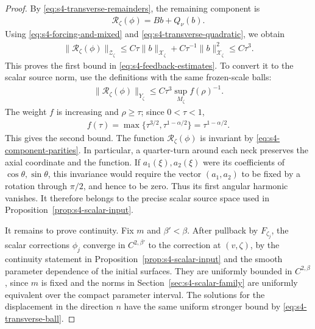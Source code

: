 \documentclass[a4paper,11pt,oneside,reqno]{amsart}
\numberwithin{equation}{section}
\theoremstyle{definition}
\begin{document}
\begin{proof}
    By \eqref{eq:s4-transverse-remainders}, the remaining
    component is
    \begin{align*}
        \mathcal{R}_\zeta(\phi)=Bb+Q_\nu(b).
    \end{align*}
    Using \eqref{eq:s4-forcing-and-mixed} and
    \eqref{eq:s4-transverse-quadratic}, we obtain
    \begin{align*}
        \|\mathcal{R}_\zeta(\phi)\|_{\mathcal{Z}_\zeta}
        \leq C\tau\|b\|_{\mathcal{X}_\zeta}
        +C\tau^{-1}\|b\|_{\mathcal{X}_\zeta}^2
        \leq C\tau^3.
    \end{align*}
    This proves the first bound in
    \eqref{eq:s4-feedback-estimates}. To convert it to the
    scalar source norm, use the definitions with the same
    frozen-scale balls:
    \begin{align*}
        \|\mathcal{R}_\zeta(\phi)\|_{Y_\zeta}
        \leq C\tau^3\sup_{M_\zeta}f(\rho)^{-1}.
    \end{align*}
    The weight $f$ is increasing and $\rho\geq\tau$; since
    $0<\tau<1$,
    \begin{align*}
        f(\tau)=\max\{\tau^{3/2},\tau^{1-\alpha/2}\}
        =\tau^{1-\alpha/2}.
    \end{align*}
    This gives the second bound. The function $\mathcal R_\zeta(\phi)$ is invariant by
    \eqref{eq:s4-component-parities}. In particular, a
    quarter-turn around each neck preserves the axial
    coordinate and the function. If $a_1(\xi),a_2(\xi)$
    were its coefficients of $\cos\theta,\sin\theta$,
    this invariance would require the vector $(a_1,a_2)$
    to be fixed by a rotation through $\pi/2$, and hence
    to be zero. Thus its first angular harmonic vanishes.
    It therefore belongs to the precise scalar source space
    used in Proposition~\ref{prop:s4-scalar-input}.

    It remains to prove continuity. Fix $m$ and $\beta'<\beta$.
    After pullback by $F_{\zeta_j}$, the scalar corrections
    $\phi_j$ converge in $C^{2,\beta'}$ to the correction at
    $(v,\zeta)$, by the continuity statement in
    Proposition~\ref{prop:s4-scalar-input} and the smooth
    parameter dependence of the initial surfaces. They are
    uniformly bounded in $C^{2,\beta}$, since $m$ is fixed
    and the norms in Section~\ref{sec:s4-scalar-family} are uniformly equivalent over
    the compact parameter interval. The solutions for the displacement in the direction $n$
    have the same uniform stronger bound by
    \eqref{eq:s4-transverse-ball}.


\end{proof}
\end{document}
